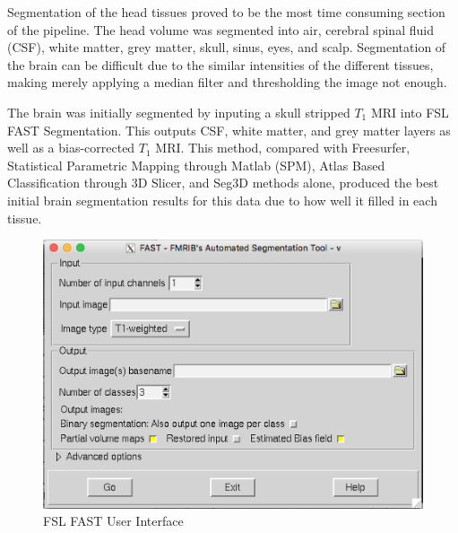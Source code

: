 
Segmentation of the head tissues proved to be the most time consuming section of the pipeline. The head volume was segmented into air, cerebral spinal fluid (CSF), white matter, grey matter, skull, sinus, eyes, and scalp. Segmentation of the brain can be difficult due to the similar intensities of the different tissues, making merely applying a median filter and thresholding the image not enough.

The brain was initially segmented by inputing a skull stripped $T_1$ MRI into FSL FAST Segmentation. This outputs CSF, white matter, and grey matter layers as well as a bias-corrected $T_1$ MRI. This method, compared with Freesurfer, Statistical Parametric Mapping through Matlab (SPM), Atlas Based Classification through 3D Slicer, and Seg3D methods alone, produced the best initial brain segmentation results for this data due to how well it filled in each tissue. 
\begin{figure}[H]
    \centering
    \includegraphics[width=.8\textwidth]{Figures/FSL_FAST}
    \caption{FSL FAST User Interface }
    \label{fig:fslfast}
\end{figure}

